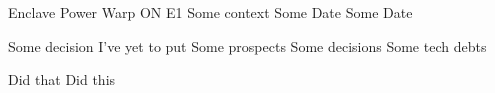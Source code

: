 \documentclass{article}
\begin{document}
\frontmatter
{Enclave} 
{Power Warp}
{ON}
{E1}
{Some context}
{Some Date}
{Some Date}

\strategy
{Some decision I've yet to put}
{Some prospects}
{Some decisions}
{Some tech debts}

\deploy
{Did that}
{Did this}
\end{document}
